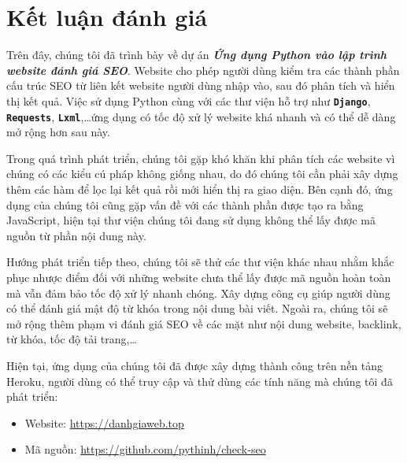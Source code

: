\chapter{Kết luận đánh giá}
Trên đây, chúng tôi đã trình bày về dự án \textbf{\textit{Ứng dụng Python vào lập trình website đánh giá SEO}}. Website cho phép người dùng kiểm tra các thành phần cấu trúc SEO từ liên kết website người dùng nhập vào, sau đó phân tích và hiển thị kết quả. Việc sử dụng Python cùng với các thư viện hỗ trợ như \textbf{\texttt{Django}}, \textbf{\texttt{Requests}}, \textbf{\texttt{Lxml}},\ldots ứng dụng có tốc độ xử lý website khá nhanh và có thể dễ dàng mở rộng hơn sau này.
\par
Trong quá trình phát triển, chúng tôi gặp khó khăn khi phân tích các website vì chúng có các kiểu cú pháp không giống nhau, do đó chúng tôi cần phải xây dựng thêm các hàm để lọc lại kết quả rồi mới hiển thị ra giao diện. Bên cạnh đó, ứng dụng của chúng tôi cũng gặp vấn đề với các thành phần được tạo ra bằng JavaScript, hiện tại thư viện chúng tôi đang sử dụng không thể lấy được mã nguồn từ phần nội dung này.
\par
Hướng phát triển tiếp theo, chúng tôi sẽ thử các thư viện khác nhau nhằm khắc phục nhược điểm đối với những website chưa thể lấy được mã nguồn hoàn toàn mà vẫn đảm bảo tốc độ xử lý nhanh chóng. Xây dựng công cụ giúp người dùng có thể đánh giá mật độ từ khóa trong nội dung bài viết. Ngoài ra, chúng tôi sẽ mở rộng thêm phạm vi đánh giá SEO về các mặt như nội dung website, backlink, từ khóa, tốc độ tải trang,\ldots
\par
Hiện tại, ứng dụng của chúng tôi đã được xây dựng thành công trên nền tảng Heroku, người dùng có thể truy cập và thử dùng các tính năng mà chúng tôi đã phát triển:
\begin{itemize}
    \item Website: \url{https://danhgiaweb.top}
    \item Mã nguồn: \url{https://github.com/pythinh/check-seo}
\end{itemize}